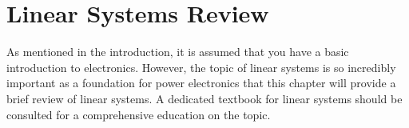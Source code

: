 \chapter{Linear Systems Review}

As mentioned in the introduction, it is assumed that you have a basic introduction to electronics. However, the topic of linear systems is so incredibly important as a foundation for power electronics that this chapter will provide a brief review of linear systems. A dedicated textbook for linear systems should be consulted for a comprehensive education on the topic.












